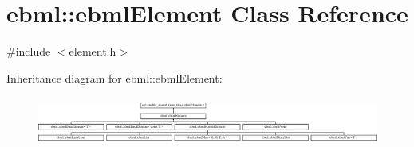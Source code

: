 \hypertarget{classebml_1_1ebmlElement}{}\section{ebml\+:\+:ebml\+Element Class Reference}
\label{classebml_1_1ebmlElement}


{\ttfamily \#include $<$element.\+h$>$}

Inheritance diagram for ebml\+:\+:ebml\+Element\+:\begin{figure}[H]
\begin{center}
\leavevmode
\includegraphics[height=1.611511cm]{classebml_1_1ebmlElement}
\end{center}
\end{figure}
